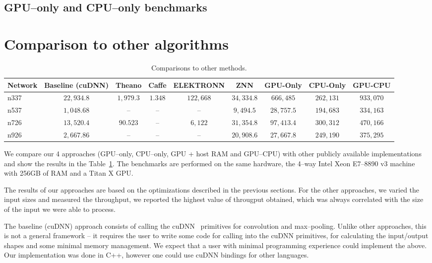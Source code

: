 \documentclass[conference]{./IEEEtran/IEEEtran}
\begin{document}
\subsection{GPU--only and CPU--only benchmarks}



\section{Comparison to other algorithms}


  \begin{table}[h!tbp]
    \centering
    \begin{tabular}{l|cccccccc}
      \toprule
      Network  & Baseline (cuDNN)  & Theano      & Caffe    & ELEKTRONN   & ZNN         & GPU-Only    & CPU-Only    & GPU-CPU   \\
      \midrule
      n337     & $22,934.8$        & $1,979.3$   & $1.348$  & $122,668$   & $34,334.8$  & $666,485$   & $262,131$   & $933,070$ \\
      n537     & $1,048.68$        & --          & --       & --          & $9,494.5$   & $28,757.5$  & $194,683$   & $334,163$ \\
      n726     & $13,520.4$        & $90.523$    & --       & $6,122$     & $31,354.8$  & $97,413.4$  & $300,312$   & $470,166$ \\
      n926     & $2,667.86$        & --          & --       & --          & $20,908.6$  & $27,667.8$  & $249,190$   & $375,295$ \\
      \bottomrule
    \end{tabular}
    \caption{Comparisons to other methods.}
    \label{table:comparisons_to_others}
  \end{table}

  We compare our 4 approaches (GPU--only, CPU--only, GPU + host RAM
  and GPU--CPU) with other publicly available implementations and show
  the results in the Table~\ref{table:comparisons_to_others}.  The
  benchmarks are performed on the same hardware, the 4--way Intel Xeon
  E7–8890 v3 machine with 256GB of RAM and a Titan X GPU.

  The results of our approaches are based on the optimizations
  described in the previous sections.  For the other approaches, we
  varied the input sizes and measured the throughput, we reported the
  highest value of througput obtained, which was always correlated
  with the size of the input we were able to process.

  The baseline (cuDNN) approach consists of calling the
  cuDNN~\cite{chetlur2014cudnn} primitives for convolution and
  max--pooling.  Unlike other approaches, this is not a general framework
  -- it requires the user to write some code for calling into the
  cuDNN primitives, for calculating the input/output shapes and some
  minimal memory management.  We expect that a user with minimal
  programming experience could implement the above.  Our
  implementation was done in C++, however one could use cuDNN bindings
  for other languages.
\end{document}
